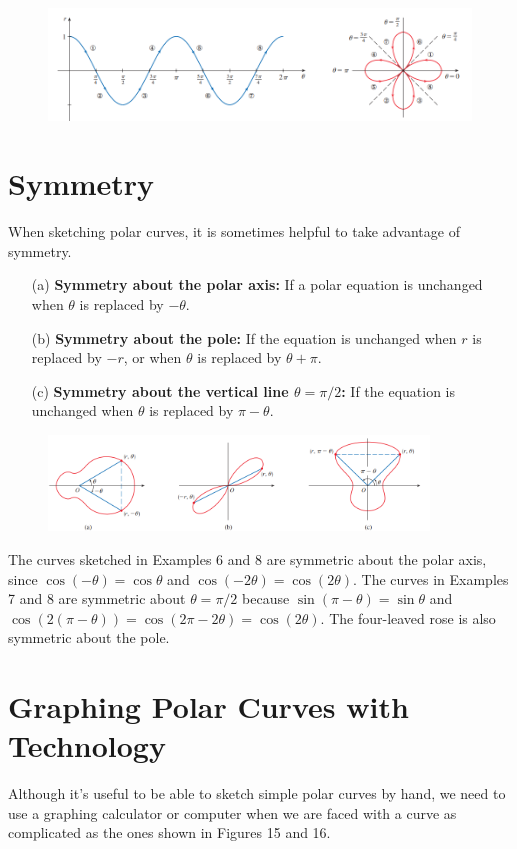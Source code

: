 \documentclass{article}
\begin{document}
\begin{figure}[htbp]
    \centering
    \includegraphics[width=1\textwidth]{graph39.png}
\end{figure}

\section*{Symmetry}
When sketching polar curves, it is sometimes helpful to take advantage of symmetry.
\begin{enumerate}
    \item[(a)] \textbf{Symmetry about the polar axis:} If a polar equation is unchanged when $\theta$ is replaced by $-\theta$.
    \item[(b)] \textbf{Symmetry about the pole:} If the equation is unchanged when $r$ is replaced by $-r$, or when $\theta$ is replaced by $\theta+\pi$.
    \item[(c)] \textbf{Symmetry about the vertical line $\theta=\pi/2$:} If the equation is unchanged when $\theta$ is replaced by $\pi-\theta$.
\end{enumerate}

\begin{figure}[htbp]
    \centering
    \includegraphics[width=0.9\textwidth]{graph40.png}
\end{figure}

The curves sketched in Examples 6 and 8 are symmetric about the polar axis, since $\cos(-\theta)=\cos\theta$ and $\cos(-2\theta)=\cos(2\theta)$. The curves in Examples 7 and 8 are symmetric about $\theta=\pi/2$ because $\sin(\pi-\theta)=\sin\theta$ and $\cos(2(\pi-\theta))=\cos(2\pi-2\theta)=\cos(2\theta)$. The four-leaved rose is also symmetric about the pole.

\section*{Graphing Polar Curves with Technology}
Although it's useful to be able to sketch simple polar curves by hand, we need to use a graphing calculator or computer when we are faced with a curve as complicated as the ones shown in Figures 15 and 16.
\end{document}

